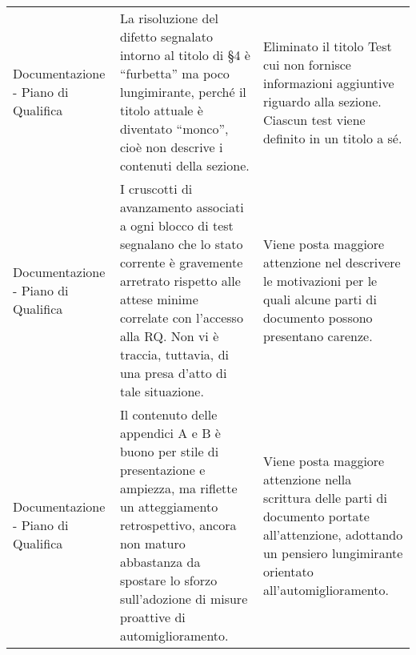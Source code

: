 \begin{longtable}{ 
					>{\centering}p{} 
					>{\centering}p{}
					>{\centering\arraybackslash}p{}}
				
				Documentazione - Piano di Qualifica
				&
				La risoluzione del difetto segnalato intorno al titolo di §4 è “furbetta” ma poco lungimirante, perché il titolo attuale è diventato “monco”, cioè non descrive i contenuti della sezione. 
				&
				Eliminato il titolo Test cui non fornisce informazioni aggiuntive riguardo alla sezione. Ciascun test viene definito in un titolo a sé. 
				\\
				
				
				Documentazione - Piano di Qualifica
				&
				I cruscotti di avanzamento associati a ogni blocco di test segnalano che lo stato corrente è gravemente arretrato rispetto alle attese minime correlate con l’accesso alla RQ. Non vi è traccia, tuttavia, di una presa d’atto di tale situazione.
				&
				Viene posta maggiore attenzione nel descrivere le motivazioni per le quali alcune parti di documento possono presentano carenze. 
				\\
				
				
				Documentazione - Piano di Qualifica
				&
				Il contenuto delle appendici A e B è buono per stile di presentazione e ampiezza, ma riflette un atteggiamento retrospettivo, ancora non maturo abbastanza da spostare lo sforzo sull’adozione di misure proattive di automiglioramento.
				&
				Viene posta maggiore attenzione nella scrittura delle parti di documento portate all'attenzione, adottando un pensiero lungimirante orientato all'automiglioramento.
				\\
				
				
			\end{longtable}
			
